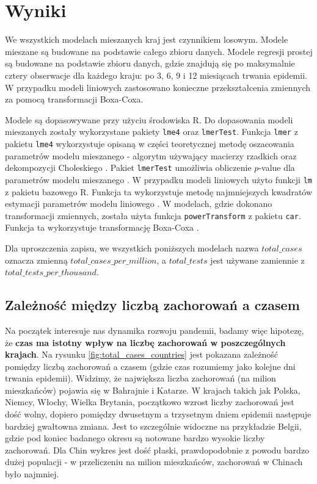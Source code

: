 \documentclass[12pt]{mwbk}
\theoremstyle{plain}
\theoremstyle{definition}
\theoremstyle{definition}
\begin{document}
 




\section{Wyniki}

We wszystkich modelach mieszanych kraj jest czynnikiem losowym. Modele mieszane są budowane na podstawie całego zbioru danych. Modele regresji prostej są budowane na podstawie zbioru danych, gdzie znajdują się po maksymalnie cztery obserwacje dla każdego kraju: po 3, 6, 9 i 12 miesiącach trwania epidemii. W przypadku modeli liniowych zastosowano konieczne przekształcenia zmiennych za pomocą transformacji Boxa-Coxa.

Modele są dopasowywane przy użyciu środowiska R. Do dopasowania modeli mieszanych zostały wykorzystane pakiety \texttt{lme4} oraz \texttt{lmerTest}. Funkcja \texttt{lmer} z pakietu \texttt{lme4} wykorzystuje opisaną w części teoretycznej metodę oszacowania parametrów modelu mieszanego - algorytm używający macierzy rzadkich oraz dekompozycji Choleskiego \cite{lme4}. Pakiet \texttt{lmerTest} umożliwia obliczenie $p$-value dla parametrów modelu mieszanego \cite{lmerTest}. W przypadku modeli liniowych użyto funkcji \texttt{lm} z pakietu bazowego R. Funkcja ta wykorzystuje metodę najmniejszych kwadratów estymacji parametrów modelu liniowego \cite{lm}. W modelach, gdzie dokonano transformacji zmiennych, została użyta funkcja \texttt{powerTransform} z pakietu \texttt{car}. Funkcja ta wykorzystuje transformację Boxa-Coxa \cite{powerTransform}.

Dla uproszczenia zapisu, we wszystkich poniższych modelach nazwa $total\_cases$ oznacza zmienną $total\_cases\_per\_million$, a $total\_tests$ jest używane zamiennie z $total\_tests\_per\_thousand$.

\subsection{Zależność między liczbą zachorowań a czasem}

Na początek interesuje nas dynamika rozwoju pandemii, badamy więc hipotezę, że \textbf{czas ma istotny wpływ na liczbę zachorowań w poszczególnych krajach}.
Na rysunku \ref{fig:total_cases_countries} jest pokazana zależność pomiędzy liczbą zachorowań a czasem (gdzie czas rozumiemy jako kolejne dni trwania epidemii). Widzimy, że największa liczba zachorowań (na milion mieszkańców) pojawia się w Bahrajnie i Katarze. W krajach takich jak Polska, Niemcy, Włochy, Wielka Brytania, początkowo wzrost liczby zachorowań jest dość wolny, dopiero pomiędzy dwusetnym a trzysetnym dniem epidemii następuje bardziej gwałtowna zmiana. Jest to szczególnie widoczne na przykładzie Belgii, gdzie pod koniec badanego okresu są notowane bardzo wysokie liczby zachorowań. Dla Chin wykres jest dość płaski, prawdopodobnie z powodu bardzo dużej populacji - w przeliczeniu na milion mieszkańców, zachorowań w Chinach było  najmniej.
\end{document}
